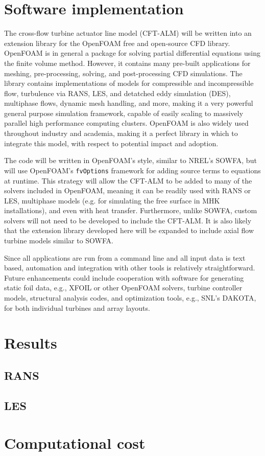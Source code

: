 \section{Software implementation}

The cross-flow turbine actuator line model (CFT-ALM) will be written into an
extension library for the OpenFOAM free and open-source CFD library. OpenFOAM is
in general a package for solving partial differential equations using the finite
volume method. However, it contains many pre-built applications for meshing,
pre-processing, solving, and post-processing CFD simulations. The library
contains implementations of models for compressible and incompressible flow,
turbulence via RANS, LES, and detatched eddy simulation (DES), multiphase flows,
dynamic mesh handling, and more, making it a very powerful general purpose
simulation framework, capable of easily scaling to massively parallel high
performance computing clusters. OpenFOAM is also widely used throughout industry
and academia, making it a perfect library in which to integrate this model, with
respect to potential impact and adoption.

The code will be written in OpenFOAM's style, similar to NREL's SOWFA, but will
use OpenFOAM's \texttt{fvOptions} framework for adding source terms to equations
at runtime. This strategy will allow the CFT-ALM to be added to many of the
solvers included in OpenFOAM, meaning it can be readily used with RANS or LES,
multiphase models (e.g. for simulating the free surface in MHK installations),
and even with heat transfer. Furthermore, unlike SOWFA, custom solvers will not
need to be developed to include the CFT-ALM. It is also likely that the
extension library developed here will be expanded to include axial flow turbine
models similar to SOWFA.

Since all applications are run from a command line and all input data is text
based, automation and integration with other tools is relatively
straightforward. Future enhancements could include cooperation with software for
generating static foil data, e.g., XFOIL or other OpenFOAM solvers, turbine
controller models, structural analysis codes, and optimization tools, e.g.,
SNL's DAKOTA, for both individual turbines and array layouts.


\section{Results}

\subsection{RANS}

\subsection{LES}

\section{Computational cost}
